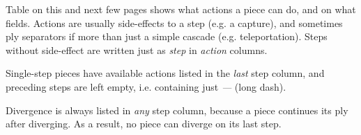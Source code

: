 
Table on this and next few pages shows what actions a piece can do, and on what
fields. Actions are usually side-effects to a step (e.g. a capture), and sometimes
ply separators if more than just a simple cascade (e.g. teleportation). Steps without
side-effect are written just as \emph{step} in \emph{action} columns.

Single-step pieces have available actions listed in the \emph{last} step column,
and preceding steps are left empty, i.e. containing just \emph{---} (long dash).

Divergence is always listed in \emph{any} step column, because a piece continues
its ply after diverging. As a result, no piece can diverge on its last step.

\clearpage %

